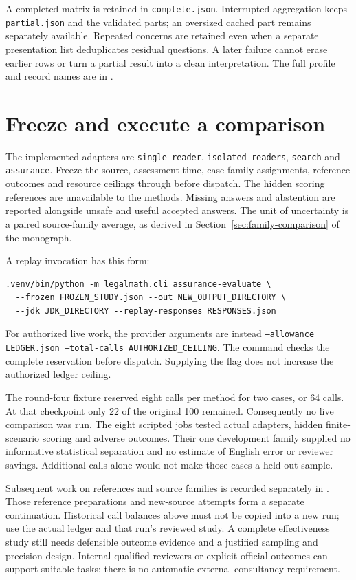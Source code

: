 \documentclass[12pt,a4paper,oneside,openany]{book}
\begin{document}
A completed matrix is retained in \texttt{complete.json}. Interrupted aggregation
keeps \texttt{partial.json} and the validated parts; an oversized cached part
remains separately available. Repeated concerns are retained even when a
separate presentation list deduplicates residual questions. A later failure
cannot erase earlier rows or turn a partial result into a clean interpretation.
The full profile and record names are in
.

\section{Freeze and execute a comparison}

The implemented adapters are \texttt{single-reader}, \texttt{isolated-readers},
\texttt{search} and \texttt{assurance}. Freeze the source, assessment time,
case-family assignments, reference outcomes and resource ceilings through
 before dispatch.
The hidden scoring references are unavailable to the methods. Missing answers
and abstention are reported alongside unsafe and useful accepted answers.
The unit of uncertainty is a paired source-family average, as derived in
Section~\ref{sec:family-comparison} of the monograph.

A replay invocation has this form:
\begin{lstlisting}
.venv/bin/python -m legalmath.cli assurance-evaluate \
  --frozen FROZEN_STUDY.json --out NEW_OUTPUT_DIRECTORY \
  --jdk JDK_DIRECTORY --replay-responses RESPONSES.json
\end{lstlisting}
For authorized live work, the provider arguments are instead
\texttt{--allowance LEDGER.json --total-calls AUTHORIZED\_CEILING}.
The command checks the complete reservation before dispatch. Supplying the
flag does not increase the authorized ledger ceiling.

The round-four fixture reserved eight calls per method for two cases, or 64
calls. At that checkpoint only 22 of the original 100 remained. Consequently
no live comparison was run. The eight scripted jobs tested actual adapters,
hidden finite-scenario scoring and adverse outcomes. Their one development
family supplied no informative statistical separation and no estimate of
English error or reviewer savings. Additional calls alone would not make
those cases a held-out sample.

Subsequent work on references and source families is recorded separately in
. Those reference preparations and new-source attempts form a separate
continuation. Historical call balances above must not be copied into a new run; use
the actual ledger and that run's reviewed study. A complete effectiveness study
still needs defensible outcome evidence and a justified sampling and precision
design. Internal qualified reviewers or explicit official outcomes can support
suitable tasks; there is no automatic external-consultancy requirement.
\end{document}
